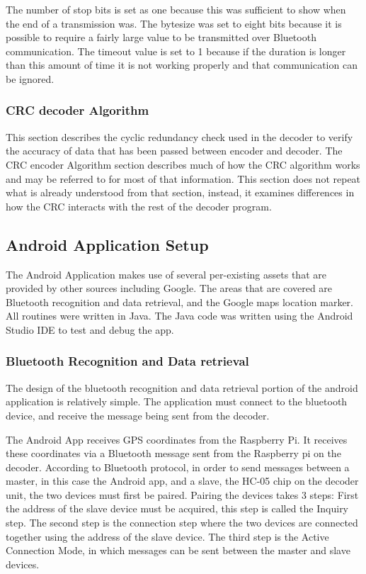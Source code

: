 \documentclass[12pt, letterpaper]{article}
\begin{document}
 The number of stop bits is set as one because this was sufficient to show when the end of a transmission was. The bytesize was set to eight bits because it is possible to require a fairly large value to be transmitted over Bluetooth communication. The timeout value is set to 1 because if the duration is longer than this amount of time it is not working properly and that communication can be ignored.

\subsubsection{CRC decoder Algorithm}
This section describes the cyclic redundancy check used in the decoder to verify the accuracy of data that has been passed between encoder and decoder. The CRC encoder Algorithm section describes much of how the CRC algorithm works and may be referred to for most of that information. This section does not repeat what is already understood from that section, instead, it examines differences in how the CRC interacts with the rest of the decoder program.

\subsection{Android Application Setup}
The Android Application makes use of several per-existing assets that are provided by other sources including Google. The areas that are covered are Bluetooth recognition and data retrieval, and the Google maps location marker. All routines were written in Java. The Java code was written using the Android Studio IDE to test and debug the app. 

\subsubsection{Bluetooth Recognition and Data retrieval}

The design of the bluetooth recognition and data retrieval portion of the android application is relatively simple. The application must connect to the bluetooth device, and receive the message being sent from the decoder. 

The Android App receives GPS coordinates from the Raspberry Pi. It receives these coordinates via a Bluetooth message sent from the Raspberry pi on the decoder. According to Bluetooth protocol, in order to send messages between a master, in this case the Android app, and a slave, the HC-05 chip on the decoder unit, the two devices must first be paired. Pairing the devices takes 3 steps: First the address of the slave device must be acquired, this step is called the Inquiry step. The second step is the connection step where the two devices are connected together using the address of the slave device. The third step is the Active Connection Mode, in which messages can be sent between the master and slave devices. \\
\end{document}
